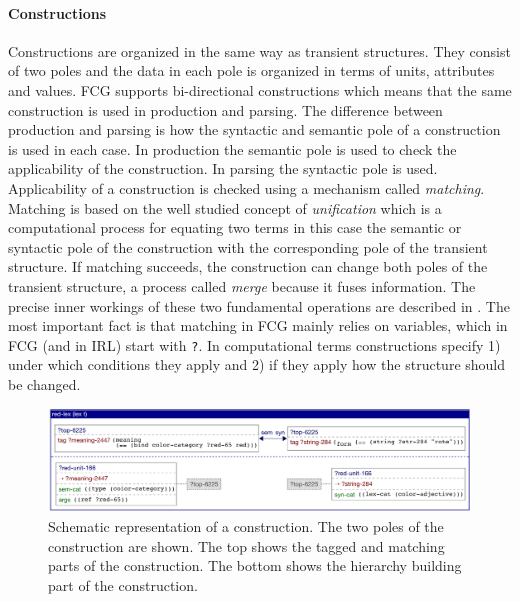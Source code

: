 \paragraph*{Constructions}
Constructions are organized in the same way as transient structures.
They consist of two poles and the data in each pole is organized in terms of units, 
attributes and values. FCG supports bi-directional constructions which means
that the same construction is used in production and parsing. 
The difference between production and parsing is how the syntactic and semantic 
pole of a construction is used in each case. 
In production the semantic pole is used to check the applicability
of the construction. In parsing the syntactic pole is used. Applicability
of a construction is checked using a mechanism called \emph{matching}.
Matching is based on the well studied concept of \emph{unification} which 
is a computational process for equating two terms in this 
case the semantic or syntactic pole of the construction with the corresponding 
pole of the transient structure. If matching succeeds, the construction can
change both poles of the transient structure, a process called \emph{merge}
because it fuses information.
The precise inner workings of these two fundamental operations 
are described in \cite{steels2006fcg}.
The most important fact is that matching in FCG mainly relies on 
variables, which in FCG (and in IRL) start with {\footnotesize\tt ?}.
In computational terms constructions specify 1) under which conditions
they apply and 2) if they apply how the structure should be changed.


\begin{figure}
\begin{center}
\includegraphics[width=1.0\columnwidth]{figs/lex-rot-cxn}
\end{center}
\caption[Schematic representation of a construction]{Schematic representation 
of a construction. The two poles
of the construction are shown. The top shows 
the tagged and matching parts of the construction. The 
bottom shows the hierarchy building part of the construction.}
\label{f:lex-rot-cxn}
\end{figure}

